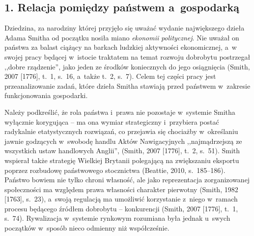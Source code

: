 \subsection[1. Relacja pomiędzy państwem a~gospodarką]{1. Relacja pomiędzy państwem a~gospodarką}

Dziedzina, za narodziny której przyjęło się uważać wydanie największego dzieła Adama Smitha od początku nosiła miano \textit{ekonomii} \textit{politycznej}. Nie uważał on państwa za balast ciążący na barkach ludzkiej aktywności ekonomicznej, a~w swojej pracy będącej w~istocie traktatem na temat rozwoju dobrobytu postrzegał ,,dobre rządzenie'', jako jeden ze środków koniecznych do jego osiągnięcia \label{ref:RNDnQbUYFullV}(Smith, 2007 [1776], t.~1, s.~16, a~także t.~2, s.~7). Celem tej części pracy jest przeanalizowanie zadań, które dzieła Smitha stawiają przed państwem w~zakresie funkcjonowania gospodarki.

Należy podkreślić, że rola państwa i~prawa nie pozostaje w~systemie Smitha wyłącznie korygująca -- ma ona wymiar strategiczny i~przybiera postać radykalnie etatystycznych rozwiązań, co przejawia się chociażby w~określaniu jawnie godzących w~swobodę handlu Aktów Nawigacyjnych ,,najmądrzejszą ze wszystkich ustaw handlowych Anglii'', \label{ref:RNDSfqMVn36ju}(Smith, 2007 [1776], t.~2, s.~51). Smith wspierał także strategię Wielkiej Brytanii polegającą na zwiększaniu eksportu poprzez rozbudowę państwowego stocznictwa \label{ref:RNDNSdWnZqXWk}(Beattie, 2010, s.~185–186). Państwo bowiem nie tylko chroni własność, ale jako reprezentacja zorganizowanej społeczności ma względem prawa własności charakter pierwotny \label{ref:RNDRS9jKbzBoD}(Smith, 1982 [1763], s.~23), a~swoją regulacją ma umożliwić korzystanie z~niego w~ramach procesu będącego źródłem dobrobytu -- konkurencji \label{ref:RND8sqtcJZ1ob}(Smith, 2007 [1776], t.~1, s.~74). Rywalizacja w~systemie rynkowym rozumiana była jednak u~swych początków w~sposób nieco odmienny niż współcześnie.

